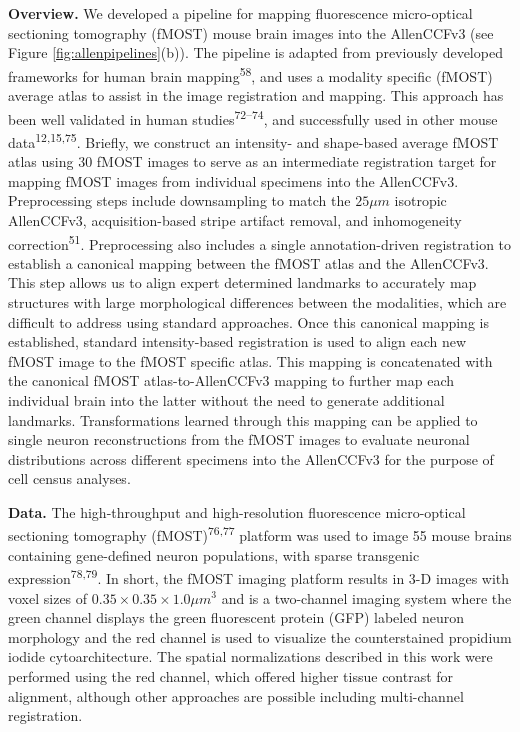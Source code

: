 \documentclass[
  12pt,
]{article}
\begin{document}
\textbf{Overview.} We developed a pipeline for mapping fluorescence
micro-optical sectioning tomography (fMOST) mouse brain images into the
AllenCCFv3 (see Figure \ref{fig:allenpipelines}(b)). The pipeline is
adapted from previously developed frameworks for human brain
mapping\textsuperscript{58}, and uses a modality specific (fMOST)
average atlas to assist in the image registration and mapping. This
approach has been well validated in human
studies\textsuperscript{72--74}, and successfully used in other mouse
data\textsuperscript{12,15,75}. Briefly, we construct an intensity- and
shape-based average fMOST atlas using 30 fMOST images to serve as an
intermediate registration target for mapping fMOST images from
individual specimens into the AllenCCFv3. Preprocessing steps include
downsampling to match the \(25 \mu m\) isotropic AllenCCFv3,
acquisition-based stripe artifact removal, and inhomogeneity
correction\textsuperscript{51}. Preprocessing also includes a single
annotation-driven registration to establish a canonical mapping between
the fMOST atlas and the AllenCCFv3. This step allows us to align expert
determined landmarks to accurately map structures with large
morphological differences between the modalities, which are difficult to
address using standard approaches. Once this canonical mapping is
established, standard intensity-based registration is used to align each
new fMOST image to the fMOST specific atlas. This mapping is
concatenated with the canonical fMOST atlas-to-AllenCCFv3 mapping to
further map each individual brain into the latter without the need to
generate additional landmarks. Transformations learned through this
mapping can be applied to single neuron reconstructions from the fMOST
images to evaluate neuronal distributions across different specimens
into the AllenCCFv3 for the purpose of cell census analyses.

\textbf{Data.} The high-throughput and high-resolution fluorescence
micro-optical sectioning tomography (fMOST)\textsuperscript{76,77}
platform was used to image 55 mouse brains containing gene-defined
neuron populations, with sparse transgenic
expression\textsuperscript{78,79}. In short, the fMOST imaging platform
results in 3-D images with voxel sizes of
\(0.35 \times 0.35 \times 1.0 \mu m^3\) and is a two-channel imaging
system where the green channel displays the green fluorescent protein
(GFP) labeled neuron morphology and the red channel is used to visualize
the counterstained propidium iodide cytoarchitecture. The spatial
normalizations described in this work were performed using the red
channel, which offered higher tissue contrast for alignment, although
other approaches are possible including multi-channel registration.
\end{document}
